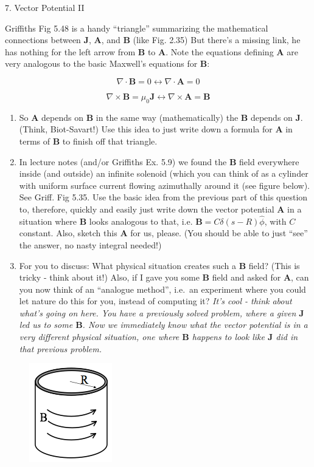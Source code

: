 \documentclass[11pt]{article}
\begin{document}
{\Large 7. Vector Potential II}\label{vector-potential-ii}

Griffiths Fig 5.48 is a handy ``triangle'' summarizing the mathematical
connections between \(\mathbf{J}\), \(\mathbf{A}\), and \(\mathbf{B}\)
(like Fig. 2.35) But there's a missing link, he has nothing for the left
arrow from \(\mathbf{B}\) to \(\mathbf{A}\). Note the equations defining
\(\mathbf{A}\) are very analogous to the basic Maxwell's equations for
\(\mathbf{B}\):

\[\nabla \cdot \mathbf{B} = 0 \leftrightarrow \nabla \cdot \mathbf{A} = 0\]

\[\nabla \times \mathbf{B} = \mu_0\mathbf{J} \leftrightarrow \nabla \times \mathbf{A} = \mathbf{B}\]

\begin{enumerate}
\def\labelenumi{\arabic{enumi}.}
\item
  So \(\mathbf{A}\) depends on \(\mathbf{B}\) in the same way
  (mathematically) the \(\mathbf{B}\) depends on \(\mathbf{J}\). (Think,
  Biot-Savart!) Use this idea to just write down a formula for
  \(\mathbf{A}\) in terms of \(\mathbf{B}\) to finish off that triangle.
\item
  In lecture notes (and/or Griffiths Ex. 5.9) we found the
  \(\mathbf{B}\) field everywhere inside (and outside) an infinite
  solenoid (which you can think of as a cylinder with uniform surface
  current flowing azimuthally around it (see figure below). See Griff.
  Fig 5.35. Use the basic idea from the previous part of this question
  to, therefore, quickly and easily just write down the vector potential
  \(\mathbf{A}\) in a situation where \(\mathbf{B}\) looks analogous to
  that, i.e. \(\mathbf{B} = C\delta(s-R)\hat{\phi}\), with \(C\)
  constant. Also, sketch this \(\mathbf{A}\) for us, please. (You should
  be able to just ``see'' the answer, no nasty integral needed!)\\
\item
  For you to discuss: What physical situation creates such a
  \(\mathbf{B}\) field? (This is tricky - think about it!) Also, if I
  gave you some \(\mathbf{B}\) field and asked for \(\mathbf{A}\), can
  you now think of an ``analogue method'', i.e.~an experiment where you
  could let nature do this for you, instead of computing it? \emph{It's
  cool - think about what's going on here. You have a previously solved
  problem, where a given \(\mathbf{J}\) led us to some \(\mathbf{B}\).
  Now we immediately know what the vector potential is in a very
  different physical situation, one where \(\mathbf{B}\) happens to look
  like \(\mathbf{J}\) did in that previous problem.}
\end{enumerate}

\begin{figure}[htbp]
\centering
\includegraphics[width=0.3\linewidth]{./images/hw10/b_circulate.png}
\end{figure}
\end{document}
